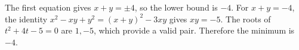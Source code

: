 The first equation gives $x+y=\pm4$, so the lower bound is $-4$. For $x+y=-4$, the identity $x^2-xy+y^2=(x+y)^2-3xy$ gives $xy=-5$. The roots of $t^2+4t-5=0$ are $1,-5$, which provide a valid pair. Therefore the minimum is $\boxed{-4}$.
